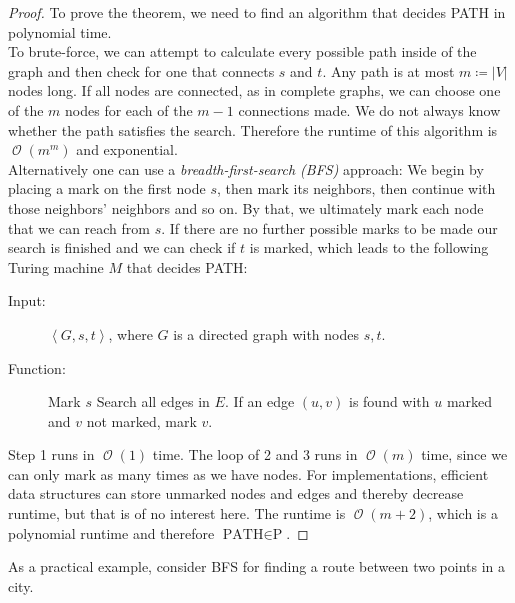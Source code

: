 \documentclass[10pt,fleqn]{article}
\theoremstyle{definition}
\theoremstyle{remark}
\newcommand{\pclass}{\text{P}}
\newcommand{\pathprob}{\text{PATH}}
\newcommand{\lpp}{\left \langle}
\newcommand{\rpp}{\right \rangle}
\newcommand{\enc}[1]{\lpp #1 \rpp}
\DeclareMathOperator{\onot}{\mathcal{O}}
\begin{document}
\begin{proof} To prove the theorem, we need to find an algorithm that decides PATH in polynomial time.\\
    
To brute-force, we can attempt to calculate every possible path inside of the graph and then check for one that connects \(s\) and \(t\). Any path is at most \(m \coloneqq |V|\) nodes long. If all nodes are connected, as in complete graphs, we can choose one of the \(m\) nodes for each of the \(m-1\) connections made. We do not always know whether the path satisfies the search. Therefore the runtime of this algorithm is \(\onot{(m^m)}\) and exponential.\\

Alternatively one can use a \emph{breadth-first-search (BFS)} approach: We begin by placing a mark on the first node \(s\), then mark its neighbors, then continue with those neighbors' neighbors and so on. By that, we ultimately mark each node that we can reach from \(s\). If there are no further possible marks to be made our search is finished and we can check if \(t\) is marked, which leads to the following Turing machine \(M\) that decides PATH:

\begin{description}
    \item[Input:] \(\enc{G, s, t}\), where \(G\) is a directed graph with nodes \(s, t\).
    \item[Function:] \phantom{}
    \begin{algorithmic}[1]
        \State Mark \(s\)
            \State Search all edges in \(E\). If an edge \((u, v)\) is found with \(u\) marked and \(v\) not marked, mark \(v\).
        \EndWhile
    \end{algorithmic}
\end{description}

Step 1 runs in \(\onot{(1)}\) time. The loop of 2 and 3 runs in \(\onot{(m)}\) time, since we can only mark as many times as we have nodes. For implementations, efficient data structures can store unmarked nodes and edges and thereby decrease runtime, but that is of no interest here. The runtime is \(\onot{(m + 2)}\), which is a polynomial runtime and therefore \(\pathprob \in \pclass\).
\end{proof}
As a practical example, consider BFS for finding a route between two points in a city.
\newpage
\end{document}
